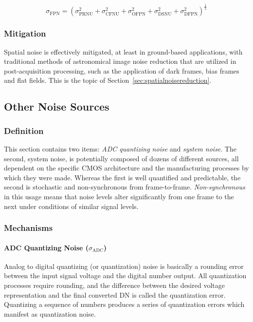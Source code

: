 \documentclass[10pt]{article}
\begin{document}
$$ \sigma_{\text{FPN}} = (\sigma^2_{\text{PRNU}} + \sigma^2_{\text{CFNU}} + \sigma^2_{\text{OFPN}} + \sigma^2_{\text{DSNU}}+ \sigma^2_{\text{DFPN}})^{\frac{1}{2}}$$

\subsubsection{Mitigation}

Spatial noise is effectively mitigated, at least in ground-based applications, with traditional methods of astronomical image noise reduction that are utilized in post-acquisition processing, such as the application of dark frames, bias frames and flat fields. This is the topic of Section~\ref{sec:spatialnoisereduction}.

\subsection{Other Noise Sources}

\subsubsection{Definition}

This section contains two items: \emph{ADC quantizing noise} and \emph{system noise}. The second, system noise, is potentially composed of dozens of different sources, all dependent on the specific CMOS architecture and the manufacturing processes by which they were made. Whereas the first is well quantified and predictable, the second is stochastic and non-synchronous from frame-to-frame. \emph{Non-synchronous} in this usage means that noise levels alter significantly from one frame to the next under conditions of similar signal levels.

\subsubsection{Mechanisms}

\paragraph{ADC Quantizing Noise (\boldmath $\sigma_{\text{ADC}}$)}
\label{sec:quant}

Analog to digital quantizing (or quantization) noise is basically a rounding error between the input signal voltage and the digital number output. All quantization processes require rounding, and the difference between the desired voltage representation and the final converted DN is called the quantization error. Quantizing a sequence of numbers produces a series of quantization errors which manifest as quantization noise. 
\end{document}
